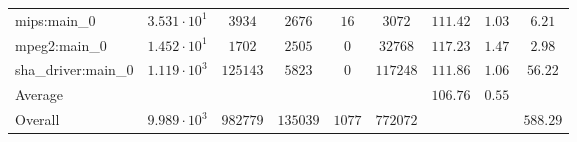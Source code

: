 \begin{tabular}{|l|c|c|c|c|c|c|c|c|}
mips:main\_0            & $ 3.531 \cdot 10^{1} $ & $ 3934   $ & $ 2676   $ & $ 16   $ & $ 3072   $ & $ 111.42      $ & $ 1.03    $ & $ 6.21    $ \\
mpeg2:main\_0           & $ 1.452 \cdot 10^{1} $ & $ 1702   $ & $ 2505   $ & $ 0    $ & $ 32768  $ & $ 117.23      $ & $ 1.47    $ & $ 2.98    $ \\
sha\_driver:main\_0     & $ 1.119 \cdot 10^{3} $ & $ 125143 $ & $ 5823   $ & $ 0    $ & $ 117248 $ & $ 111.86      $ & $ 1.06    $ & $ 56.22   $ \\
\hline
Average                 & $                    $ & $        $ & $        $ & $      $ & $        $ & $ 106.76      $ & $ 0.55    $ & $         $ \\
\hline
Overall                 & $ 9.989 \cdot 10^{3} $ & $ 982779 $ & $ 135039 $ & $ 1077 $ & $ 772072 $ & $             $ & $         $ & $ 588.29  $ \\
\hline
\end{tabular}
